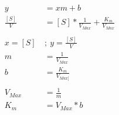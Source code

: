 \begin{align*}
    y &= xm+b
    \\
    \frac{[S]}{V}  &= [S] * \frac{1}{V_{Max}} + \frac{K_{m}}{V_{Max}}
    \\
    \\
    x = [S] \ &; \ y = \frac{[S]}{V}
    \\
    m &= \frac{1}{V_{Max}}
    \\
    b &= \frac{K_{m}}{V_{Max]}}
    \\
    \\
    V_{Max} &= \frac{1}{m}
    \\
    K_{m} &= V_{Max} * b
\end{align*}

